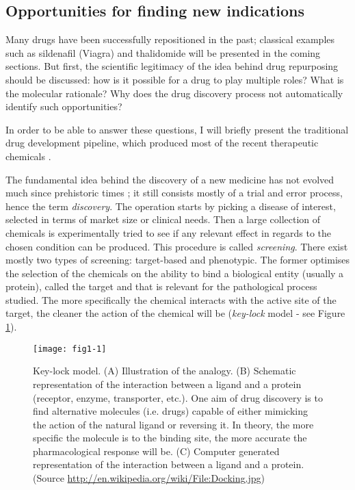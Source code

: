 \subsection{Opportunities for finding new indications}
\label{sec:opp}

Many drugs have been successfully repositioned in the past; classical examples such as sildenafil (Viagra) and thalidomide will be presented in the coming sections. But first, the scientific legitimacy of the idea behind drug repurposing should be discussed: how is it possible for a drug to play multiple roles? What is the molecular rationale? Why does the drug discovery process not automatically identify such opportunities?

In order to be able to answer these questions, I will briefly present the traditional drug development pipeline, which produced most of the recent therapeutic chemicals \citep{swinney2011were}.

The fundamental idea behind the discovery of a new medicine has not evolved much since prehistoric times \citep{prehistoricwiki}; it still consists mostly of a trial and error process, hence the term \emph{discovery}. The operation starts by picking a disease of interest, selected in terms of market size or clinical needs. Then a large collection of chemicals is experimentally tried to see if any relevant effect in regards to the chosen condition can be produced. This procedure is called \emph{screening}. There exist mostly two types of screening: target-based and phenotypic. The former optimises the selection of the chemicals on the ability to bind a biological entity (usually a protein), called the target and that is relevant for the pathological process studied. The more specifically the chemical interacts with the active site of the target, the cleaner the action of the chemical will be (\emph{key-lock} model - see Figure \ref{fig1-1}).

\begin{figure}[ht]
    \centering
    \texttt{[image: fig1-1]}
    \caption{Key-lock model. (A) Illustration of the analogy. (B) Schematic representation of the interaction between a ligand and a protein (receptor, enzyme, transporter, etc.). One aim of drug discovery is to find alternative molecules (i.e. drugs) capable of either mimicking the action of the natural ligand or reversing it. In theory, the more specific the molecule is to the binding site, the more accurate the pharmacological response will be. (C) Computer generated representation of the interaction between a ligand and a protein. (Source \url{http://en.wikipedia.org/wiki/File:Docking.jpg})}
    \label{fig1-1}
\end{figure}

